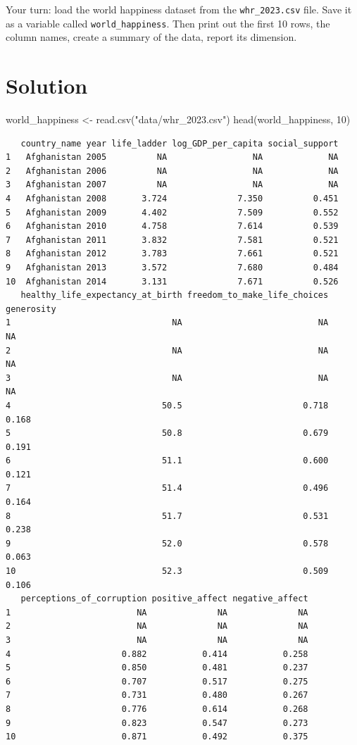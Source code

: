 \documentclass[
  letterpaper,
  DIV=11,
  numbers=noendperiod]{scrreprt}
\newenvironment{Shaded}{\begin{snugshade}}{\end{snugshade}}
\newcommand{\DecValTok}[1]{\textcolor[rgb]{0.68,0.00,0.00}{#1}}
\newcommand{\FunctionTok}[1]{\textcolor[rgb]{0.28,0.35,0.67}{#1}}
\newcommand{\NormalTok}[1]{\textcolor[rgb]{0.00,0.23,0.31}{#1}}
\newcommand{\OtherTok}[1]{\textcolor[rgb]{0.00,0.23,0.31}{#1}}
\newcommand{\StringTok}[1]{\textcolor[rgb]{0.13,0.47,0.30}{#1}}
\begin{document}
Your turn: load the world happiness dataset from the
\texttt{whr\_2023.csv} file. Save it as a variable called
\texttt{world\_happiness}. Then print out the first 10 rows, the column
names, create a summary of the data, report its dimension.

\section{Solution}

\begin{Shaded}
\begin{Highlighting}[]
\NormalTok{world\_happiness }\OtherTok{\textless{}{-}} \FunctionTok{read.csv}\NormalTok{(}\StringTok{"data/whr\_2023.csv"}\NormalTok{)}
\FunctionTok{head}\NormalTok{(world\_happiness, }\DecValTok{10}\NormalTok{)}
\end{Highlighting}
\end{Shaded}

\begin{verbatim}
   country_name year life_ladder log_GDP_per_capita social_support
1   Afghanistan 2005          NA                 NA             NA
2   Afghanistan 2006          NA                 NA             NA
3   Afghanistan 2007          NA                 NA             NA
4   Afghanistan 2008       3.724              7.350          0.451
5   Afghanistan 2009       4.402              7.509          0.552
6   Afghanistan 2010       4.758              7.614          0.539
7   Afghanistan 2011       3.832              7.581          0.521
8   Afghanistan 2012       3.783              7.661          0.521
9   Afghanistan 2013       3.572              7.680          0.484
10  Afghanistan 2014       3.131              7.671          0.526
   healthy_life_expectancy_at_birth freedom_to_make_life_choices generosity
1                                NA                           NA         NA
2                                NA                           NA         NA
3                                NA                           NA         NA
4                              50.5                        0.718      0.168
5                              50.8                        0.679      0.191
6                              51.1                        0.600      0.121
7                              51.4                        0.496      0.164
8                              51.7                        0.531      0.238
9                              52.0                        0.578      0.063
10                             52.3                        0.509      0.106
   perceptions_of_corruption positive_affect negative_affect
1                         NA              NA              NA
2                         NA              NA              NA
3                         NA              NA              NA
4                      0.882           0.414           0.258
5                      0.850           0.481           0.237
6                      0.707           0.517           0.275
7                      0.731           0.480           0.267
8                      0.776           0.614           0.268
9                      0.823           0.547           0.273
10                     0.871           0.492           0.375
\end{verbatim}
\end{document}
